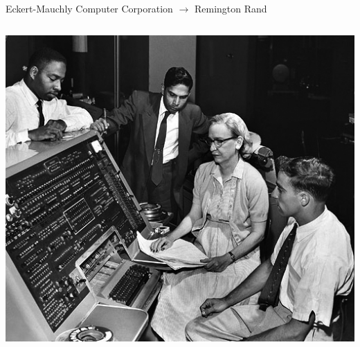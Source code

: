 \documentclass[aspectratio=169]{beamer}
\begin{document}
\begin{frame}[fragile]{Eckert-Mauchly Computer Corporation $\to$ Remington Rand}
\begin{columns}
\includegraphics[width=\linewidth]{Grace_Hopper_and_UNIVAC.jpg}
\end{columns}
\end{frame}
\end{document}
